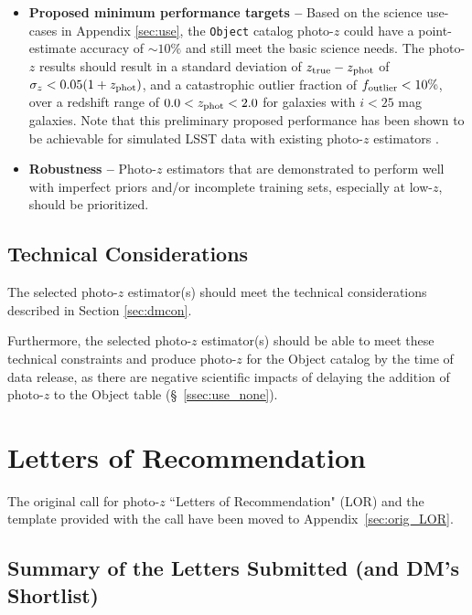 \documentclass[DM,authoryear,toc]{lsstdoc}
\begin{document}
\begin{itemize}
\item \textbf{Proposed minimum performance targets --} 
Based on the science use-cases in Appendix \ref{sec:use}, the {\tt Object} catalog photo-$z$ could have a point-estimate accuracy of $\sim10\%$ and still meet the basic science needs.
The photo-$z$ results should result in a standard deviation of $z_{\rm true}-z_{\rm phot}$ of $\sigma_z < 0.05(1+z_{\rm phot})$, and a catastrophic outlier fraction of $f_{\rm outlier} < 10\%$, over a redshift range of $0.0 < z_{\rm phot} < 2.0$ for galaxies with $i<25$ mag galaxies.
Note that this preliminary proposed performance has been shown to be achievable for simulated LSST data with existing photo-$z$ estimators \citep[e.g.,][]{2018AJ....155....1G,2020MNRAS.499.1587S}.
\item \textbf{Robustness -- } Photo-$z$ estimators that are demonstrated to perform well with imperfect priors and/or incomplete training sets, especially at low-$z$, should be prioritized.
\end{itemize}

\subsection{Technical Considerations}

The selected photo-$z$ estimator(s) should meet the technical considerations described in Section \ref{sec:dmcon}.

Furthermore, the selected photo-$z$ estimator(s) should be able to meet these technical constraints and produce photo-$z$ for the Object catalog by the time of data release, as there are negative scientific impacts of delaying the addition of photo-$z$ to the Object table (\S~\ref{ssec:use_none}).



\section{Letters of Recommendation} \label{sec:lor}

The original call for photo-$z$ ``Letters of Recommendation" (LOR) and the template provided with the call have been moved to Appendix~\ref{sec:orig_LOR}.

\subsection{Summary of the Letters Submitted (and DM's Shortlist)} \label{ssec:lor_choice}
\end{document}

